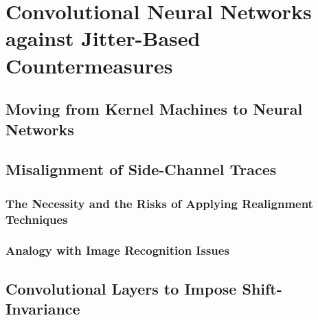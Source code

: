 
\chapter{Convolutional Neural Networks against Jitter-Based Countermeasures} %

\label{ChapterCNN}

\section{Moving from Kernel Machines to Neural Networks}

\section{Misalignment of Side-Channel Traces}

\subsection{The Necessity and the Risks of Applying Realignment Techniques}
\subsection{Analogy with Image Recognition Issues}


\section{Convolutional Layers to Impose Shift-Invariance}


